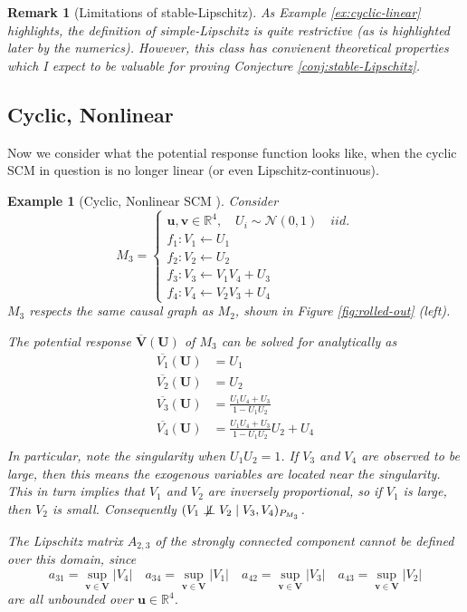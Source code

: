 \documentclass[letterpaper,10pt]{article}
\newtheorem{example}{Example}
\newtheorem{remark}{Remark}
\newcommand{\CI}{\mathrel{\perp\mspace{-10mu}\perp}}
\newcommand{\nCI}{\centernot{\CI}}
\begin{document}
\begin{remark}[Limitations of stable-Lipschitz]
As Example \ref{ex:cyclic-linear} highlights, the definition of simple-Lipschitz is quite restrictive (as is highlighted later by the numerics). However, this class has convienent theoretical properties which I expect to be valuable for proving Conjecture \ref{conj:stable-Lipschitz}.
\end{remark}



\subsection{Cyclic, Nonlinear}
Now we consider what the potential response function looks like, when the cyclic SCM in question is no longer linear (or even Lipschitz-continuous).

\begin{example}[Cyclic, Nonlinear SCM \cite{Acyclification}]\label{ex:cyclic-nonlinear}
Consider
\[
M_3 = 
\begin{cases}
\mathbf{u}, \mathbf{v}\in \mathbb{R}^4, \quad U_i \sim \mathcal{N}(0,1) \quad iid. \\
f_1:V_1\leftarrow U_1 \\
f_2:V_2\leftarrow U_2 \\
f_3:V_3\leftarrow V_1V_4+U_3 \\
f_4:V_4\leftarrow V_2V_3+U_4
\end{cases}
\]
$M_3$ respects the same causal graph as $M_2$, shown in Figure \ref{fig:rolled-out} (left).

The potential response $\overline{\mathbf{V}}(\mathbf{U})$ of $M_3$ can be solved for analytically as
\begin{align*}
\overline{V_1}(\mathbf{U}) &= U_1 \\
\overline{V_2}(\mathbf{U}) &= U_2 \\
\overline{V_3}(\mathbf{U}) &= \frac{U_1U_4 + U_3}{1-U_1U_2} \\
\overline{V_4}(\mathbf{U}) &= \frac{U_1U_4 + U_3}{1-U_1U_2}U_2 + U_4 \\
\end{align*}
In particular, note the singularity when $U_1U_2=1$. If $V_3$ and $V_4$ are observed to be large, then this means the exogenous variables are located near the singularity. This in turn implies that $V_1$ and $V_2$ are inversely proportional, so if $V_1$ is large, then $V_2$ is small. Consequently $(V_1 \nCI V_2 \mid V_3,V_4)_{P_{M_3}}$.

The Lipschitz matrix $A_{2,3}$ of the strongly connected component cannot be defined over this domain, since
\[
a_{31} = \sup_{\mathbf{v}\in\mathbf{V}}\lvert V_4\rvert \quad
a_{34} = \sup_{\mathbf{v}\in\mathbf{V}}\lvert V_1\rvert \quad
a_{42} = \sup_{\mathbf{v}\in\mathbf{V}}\lvert V_3\rvert \quad
a_{43} = \sup_{\mathbf{v}\in\mathbf{V}}\lvert V_2\rvert 
\]
are all unbounded over $\mathbf{u}\in \mathbb{R}^4$.
\end{example}
\end{document}
